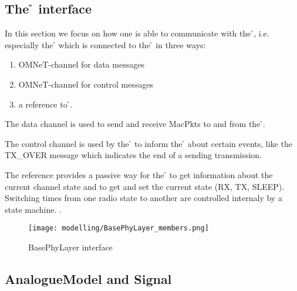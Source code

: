 \subsection{The \h{\bp} interface}

In this section we focus on how one is able to communicate with the 
\h{\bp}, i.e. especially the \h{\bm} which is connected to the \h{\bp}
in three ways:

\begin{enumerate}
 \item OMNeT-channel for data messages
 \item OMNeT-channel for control messages
 \item a reference to \h{\bp}.
\end{enumerate} 

The data channel is used to send and receive MacPkts to and from the \h{\bp}.

The control channel is used by the \h{\bp} to inform the \h{\bm} about
certain events, like the TX\_OVER message 
which indicates the end of a sending transmission.

The reference provides a passive way for the  \h{\bm} to  get information about the current channel state and to get and set the current state (RX, TX, SLEEP).
Switching times from one radio state to another are controlled internaly by a state machine. .


\begin{figure}[H]
 \centering
 \texttt{[image: modelling/BasePhyLayer\_members.png]}
 \caption{BasePhyLayer interface}
 \label{fig: BasePhyLayer interface}
\end{figure}



\subsection{AnalogueModel and Signal}
\label{AM and Signal}



